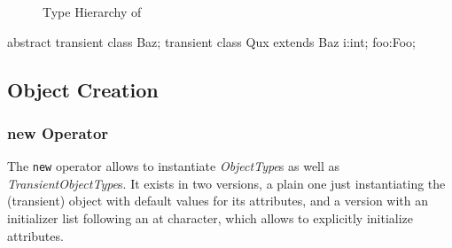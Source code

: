 \begin{figure}[htbp]
		\caption{Type Hierarchy of \GrG}
	\label{fig:alltypes}
\end{figure}



\begin{example}
\begin{grgen}
abstract transient class Baz;
transient class Qux extends Baz {
  i:int;
  foo:Foo;
}
\end{grgen}
\end{example}


\subsection{Object Creation}

\subsubsection{new Operator}\label{subsec:copynclonefunctions}

The \texttt{new} operator allows to instantiate \emph{ObjectType}s as well as \emph{TransientObjectType}s.
It exists in two versions, a plain one just instantiating the (transient) object with default values for its attributes, and a version with an initializer list following an at character, which allows to explicitly initialize attributes.

